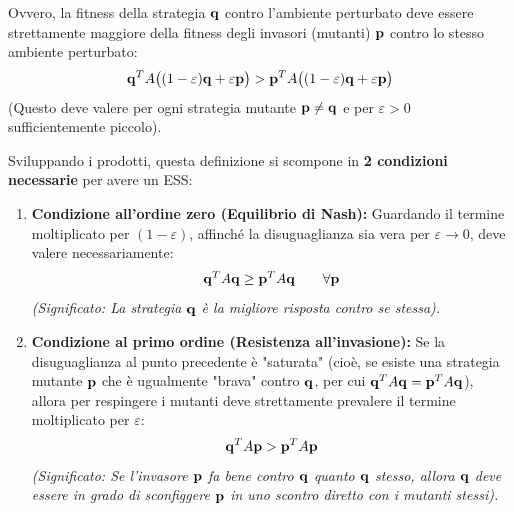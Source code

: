 \documentclass[openany]{book}
\theoremstyle{definition}
\theoremstyle{remark}
\begin{document}
Ovvero, la fitness della strategia $\vb{q}$ contro l'ambiente perturbato deve essere strettamente maggiore della fitness degli invasori (mutanti) $\vb{p}$ contro lo stesso ambiente perturbato:
\begin{equation}
    \vb{q}^T A \big( (1-\varepsilon)\vb{q} + \varepsilon \vb{p} \big) > \vb{p}^T A \big( (1-\varepsilon)\vb{q} + \varepsilon \vb{p} \big)
\end{equation}
(Questo deve valere per ogni strategia mutante $\vb{p} \neq \vb{q}$ e per $\varepsilon > 0$ sufficientemente piccolo).

Sviluppando i prodotti, questa definizione si scompone in \textbf{2 condizioni necessarie} per avere un ESS:

\begin{enumerate}
    \item \textbf{Condizione all'ordine zero (Equilibrio di Nash):} 
    Guardando il termine moltiplicato per $(1-\varepsilon)$, affinché la disuguaglianza sia vera per $\varepsilon \to 0$, deve valere necessariamente:
    \begin{equation}
        \vb{q}^T A \vb{q} \ge \vb{p}^T A \vb{q} \qquad \forall \vb{p}
    \end{equation}
    \textit{(Significato: La strategia $\vb{q}$ è la migliore risposta contro se stessa).}
    
    \item \textbf{Condizione al primo ordine (Resistenza all'invasione):}
    Se la disuguaglianza al punto precedente è "saturata" (cioè, se esiste una strategia mutante $\vb{p}$ che è ugualmente "brava" contro $\vb{q}$, per cui $\vb{q}^T A \vb{q} = \vb{p}^T A \vb{q}$), allora per respingere i mutanti deve strettamente prevalere il termine moltiplicato per $\varepsilon$:
    \begin{equation}
        \vb{q}^T A \vb{p} > \vb{p}^T A \vb{p}
    \end{equation}
    \textit{(Significato: Se l'invasore $\vb{p}$ fa bene contro $\vb{q}$ quanto $\vb{q}$ stesso, allora $\vb{q}$ deve essere in grado di sconfiggere $\vb{p}$ in uno scontro diretto con i mutanti stessi).}
\end{enumerate}

\newpage
{}
\end{document}
